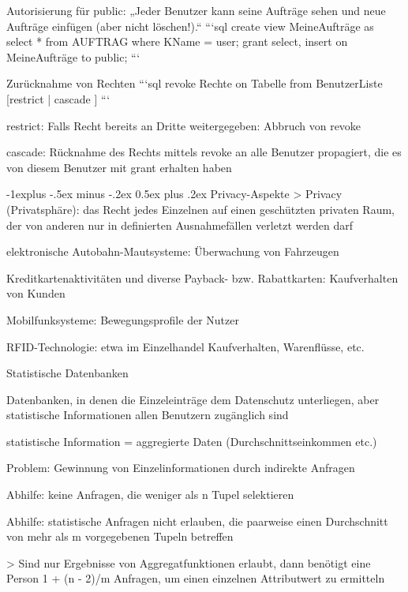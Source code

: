 \documentclass[a4paper]{article}
\makeatletter
\renewcommand{\subsection}{\@startsection{subsection}{2}{0mm}%
                                {-1explus -.5ex minus -.2ex}%
                                {0.5ex plus .2ex}%
                                {\normalfont\normalsize\bfseries}}
\makeatother
\begin{document}
\begin{multicols}{3}
\begin{itemize*}
    Autorisierung für public: „Jeder Benutzer kann seine Aufträge sehen und neue Aufträge einfügen (aber nicht löschen!).“
    ```sql
    create view MeineAufträge as
    select *
    from AUFTRAG
    where KName = user;
    grant select, insert
    on MeineAufträge
    to public;
    ```

    Zurücknahme von Rechten
    ```sql
    revoke Rechte
    on Tabelle
    from BenutzerListe
        [restrict | cascade ]
    ```
    \begin{itemize*}
        \item restrict: Falls Recht bereits an Dritte weitergegeben: Abbruch von revoke
        \item cascade: Rücknahme des Rechts mittels revoke an alle Benutzer propagiert, die es von diesem Benutzer mit grant erhalten haben
    \end{itemize*}


    \subsection{Privacy-Aspekte}
    > Privacy (Privatsphäre): das Recht jedes Einzelnen auf einen geschützten privaten Raum, der von anderen nur in definierten Ausnahmefällen verletzt werden darf
    \begin{itemize*}
        \item elektronische Autobahn-Mautsysteme: Überwachung von Fahrzeugen
        \item Kreditkartenaktivitäten und diverse Payback- bzw. Rabattkarten: Kaufverhalten von Kunden
        \item Mobilfunksysteme: Bewegungsprofile der Nutzer
        \item RFID-Technologie: etwa im Einzelhandel Kaufverhalten, Warenflüsse, etc.
    \end{itemize*}

    Statistische Datenbanken
    \begin{itemize*}
        \item Datenbanken, in denen die Einzeleinträge dem Datenschutz unterliegen, aber statistische Informationen allen Benutzern zugänglich sind
        \item statistische Information = aggregierte Daten (Durchschnittseinkommen etc.)
        \item Problem: Gewinnung von Einzelinformationen durch indirekte Anfragen
        \begin{itemize*}
            \item Abhilfe: keine Anfragen, die weniger als n Tupel selektieren
            \item Abhilfe: statistische Anfragen nicht erlauben, die paarweise einen Durchschnitt von mehr als m vorgegebenen Tupeln betreffen
        \end{itemize*}
    \end{itemize*}
    > Sind nur Ergebnisse von Aggregatfunktionen erlaubt, dann benötigt eine Person 1 + (n - 2)/m Anfragen, um einen einzelnen Attributwert zu ermitteln


\end{itemize*}
\end{multicols}
\end{document}
